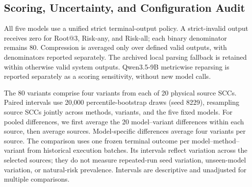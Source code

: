 \begin{revadded}
\section{Scoring, Uncertainty, and Configuration Audit}
\label{app:scoring_audit}

All five models use a unified strict terminal-output policy. A strict-invalid output receives zero for Root@3, Risk-any, and Risk-all; each binary denominator remains 80. Compression is averaged only over defined valid outputs, with denominators reported separately. The archived local parsing fallback is retained within otherwise valid system outputs. Qwen3.5-9B metricwise reparsing is reported separately as a scoring sensitivity, without new model calls.

The 80 variants comprise four variants from each of 20 physical source SCCs. Paired intervals use 20,000 percentile-bootstrap draws (seed 8229), resampling source SCCs jointly across methods, variants, and the five fixed models. For pooled differences, we first average the 20 model--variant differences within each source, then average sources. Model-specific differences average four variants per source. The comparison uses one frozen terminal outcome per model--method--variant from historical execution batches. Its intervals reflect variation across the selected sources; they do not measure repeated-run seed variation, unseen-model variation, or natural-risk prevalence. Intervals are descriptive and unadjusted for multiple comparisons.


\end{revadded}
